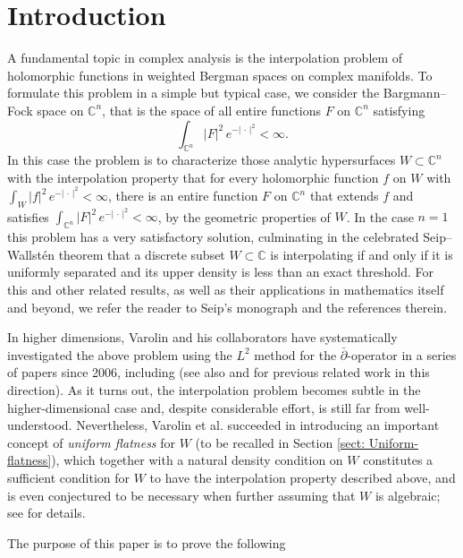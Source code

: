 \documentclass[12pt,a4paper]{amsart}
\numberwithin{equation}{section}
\theoremstyle{definition}
\begin{document}
\section{Introduction}
A fundamental topic in complex analysis is the interpolation problem of holomorphic functions in weighted Bergman spaces on complex manifolds. To formulate this problem in a simple but typical case, we consider the Bargmann--Fock space on $\mathbb C^n$, that is the space of all entire functions $F$ on $\mathbb C^n$ satisfying
   $$
   \int_{\mathbb C^n} |F|^2\,e^{-|\,\cdot\,|^2}<\infty.
   $$
In this case the problem is to characterize those analytic hypersurfaces $W\subset \mathbb C^n$ with the interpolation property that for every holomorphic function $f$ on $W$ with $\int_W |f|^2\,e^{-|\,\cdot\,|^2}<\infty$, there is an entire function $F$ on $\mathbb C^n$ that extends $f$ and satisfies
$\int_{\mathbb C^n} |F|^2\,e^{-|\,\cdot\,|^2}<\infty$, by the geometric properties of $W$. In the case $n=1$ this problem has a very satisfactory solution, culminating in the celebrated Seip--Wallst\'{e}n theorem that a discrete subset $W\subset \mathbb C$ is interpolating if and only if it is uniformly separated and its upper density is less than an exact threshold. For this and other related results, as well as their applications in mathematics itself and beyond, we refer the reader to Seip's monograph \cite{Seip_book04} and the references therein.

In higher dimensions, Varolin and his collaborators have systematically investigated the above problem using the $L^2$ method for the $\bar{\partial}$-operator in a series of papers since 2006, including \cite{OCS-Varolin_MA06, PV_Crelle16} (see also \cite{Ohsawa_IV, Ohsawa_V} and \cite{Bern-Ortega_Crelle95} for previous related work in this direction). As it turns out, the interpolation problem becomes subtle in the higher-dimensional case and, despite considerable effort, is still far from well-understood. Nevertheless, Varolin et al. succeeded in introducing an important concept of {\it uniform flatness} for $W$ (to be recalled in Section \ref{sect: Uniform-flatness}), which together with a natural density condition on $W$ constitutes a sufficient condition for $W$ to have the interpolation property described above, and is even conjectured to be necessary when further assuming that $W$ is algebraic; see \cite{OCS-Varolin_MA06, PV_Crelle16, PV_Nagoya21, MPV_Nagoya23} for details.



The purpose of this paper is to prove the following
\end{document}
